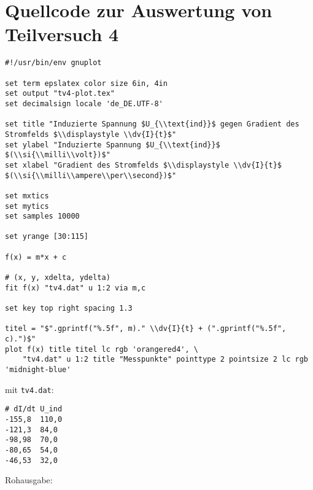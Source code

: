 \section{\gnuplot{} Quellcode zur Auswertung von Teilversuch 4}
    \label{appdx:gnuplottv4}
    {  
        \renewcommand{\fcolorbox}[4][]{#4}
        \begin{verbatim}
#!/usr/bin/env gnuplot

set term epslatex color size 6in, 4in
set output "tv4-plot.tex"
set decimalsign locale 'de_DE.UTF-8'

set title "Induzierte Spannung $U_{\\text{ind}}$ gegen Gradient des Stromfelds $\\displaystyle \\dv{I}{t}$"
set ylabel "Induzierte Spannung $U_{\\text{ind}}$ $(\\si{\\milli\\volt})$"
set xlabel "Gradient des Stromfelds $\\displaystyle \\dv{I}{t}$ $(\\si{\\milli\\ampere\\per\\second})$"

set mxtics
set mytics
set samples 10000

set yrange [30:115]

f(x) = m*x + c

# (x, y, xdelta, ydelta)
fit f(x) "tv4.dat" u 1:2 via m,c

set key top right spacing 1.3

titel = "$".gprintf("%.5f", m)." \\dv{I}{t} + (".gprintf("%.5f", c).")$"
plot f(x) title titel lc rgb 'orangered4', \
    "tv4.dat" u 1:2 title "Messpunkte" pointtype 2 pointsize 2 lc rgb 'midnight-blue'
        \end{verbatim}
    }
    mit \texttt{tv4.dat}:
    \begin{verbatim}
# dI/dt U_ind
-155,8  110,0
-121,3  84,0 
-98,98  70,0 
-80,65  54,0 
-46,53  32,0 
    \end{verbatim}
    Rohausgabe:
